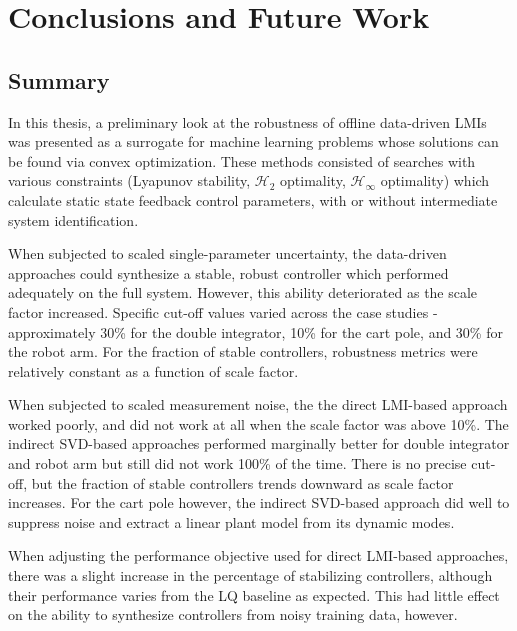 \chapter{Conclusions and Future Work}
\label{chap:conclusion}
\section{Summary}
In this thesis, a preliminary look at the robustness of offline data-driven LMIs was presented as a surrogate for machine learning problems whose solutions can be found via convex optimization.  These methods consisted of searches with various constraints (Lyapunov stability, $\mathcal{H}_{2}$ optimality, $\mathcal{H}_{\infty}$ optimality) which calculate static state feedback control parameters, with or without intermediate system identification.

When subjected to scaled single-parameter uncertainty, the data-driven approaches could synthesize a stable, robust controller which performed adequately on the full system.  However, this ability deteriorated as the scale factor increased.  Specific cut-off values varied across the case studies - approximately 30\% for the double integrator, 10\% for the cart pole, and 30\% for the robot arm.  For the fraction of stable controllers, robustness metrics were relatively constant as a function of scale factor.

When subjected to scaled measurement noise, the the direct LMI-based approach worked poorly, and did not work at all when the scale factor was above 10\%.  The indirect SVD-based approaches performed marginally better for double integrator and robot arm but still did not work 100\% of the time.  There is no precise cut-off, but the fraction of stable controllers trends downward as scale factor increases.  For the cart pole however, the indirect SVD-based approach did well to suppress noise and extract a linear plant model from its dynamic modes.

When adjusting the performance objective used for direct LMI-based approaches, there was a slight increase in the percentage of stabilizing controllers, although their performance varies from the LQ baseline as expected.  This had little effect on the ability to synthesize controllers from noisy training data, however.

